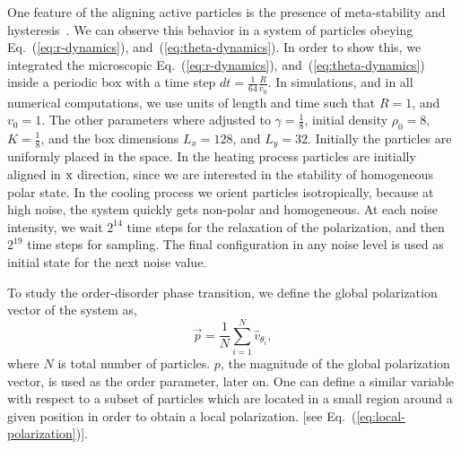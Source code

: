 \documentclass[reprint,floatfix,amsmath,amssymb,aps,pre,showkeys,showpacs,superscriptaddress]{revtex4-1}
\newcommand{\p}{p}
\newcommand{\vp}{\vec{\p}}
\newcommand{\hl}[1]{\textcolor{hlcolor}{#1}}
\newcommand{\req}[1]{Eq.~(\ref{#1})}
\newcommand{\reqs}[2]{Eq.~(\ref{#1}), and~(\ref{#2})}
\begin{document}
One feature of the aligning active particles is the presence of meta-stability and hysteresis~\cite{Gregoire2004,nagy2007,Chate2008,Chate2008a,Ihle2013invasion,solon2015from,solon2015flocking,solon2015pattern,thuroff2014numerical}. We can observe this behavior in a system of particles obeying \reqs{eq:r-dynamics}{eq:theta-dynamics}. In order to show this, we integrated \hl{the} microscopic \reqs{eq:r-dynamics}{eq:theta-dynamics} \hl{inside a periodic box} with \hl{a} time \hl{step} $dt=\tfrac{1}{64} \tfrac{R}{v_0}$. In simulations, and in all numerical computations, we use units of length and time such that $R=1$, and $v_0=1$. The other parameters where adjusted to $\gamma = \tfrac{1}{8}$, initial density $\rho_0=8$, $K = \tfrac{1}{8}$, and \hl{the} box dimensions $L_x=128$, and $L_y=32$. \hl{Initially the particles are uniformly placed in the space. In the heating process particles are initially aligned in ${\rm x}$ direction, since we are interested in the stability of homogeneous polar state. In the cooling process we orient particles isotropically, because at high noise, the system quickly gets non-polar and homogeneous. At each noise intensity, we wait $2^{14}$ time steps for the relaxation of the polarization, and then $2^{19}$ time steps for sampling. The final configuration in any noise level is used as initial state for the next noise value.}

To study the order-disorder phase transition, we define the global polarization vector of the system as,
\begin{equation}
\vp = \frac{1}{N} \sum_{i=1}^N \hat{v}_{\theta_i},
\label{eq:polarization}
\end{equation}
where $N$ is total number of particles. $\p$, the magnitude of the global polarization vector, is used as the order parameter, later on. \hl{One can define a similar variable with respect to a subset of particles which are located in a small region around a given position in order to obtain a local polarization.} \hl{[see \req{eq:local-polarization}]}.
\end{document}

